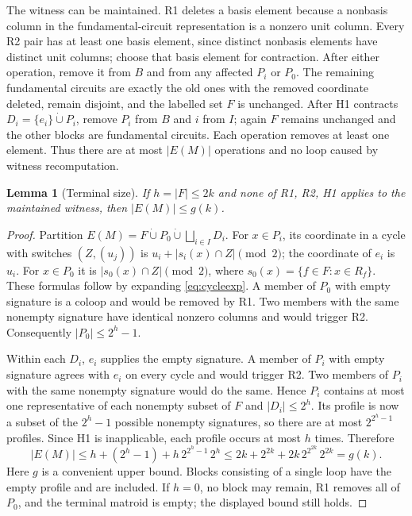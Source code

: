 \documentclass[11pt]{article}
\newtheorem{lemma}[theorem]{Lemma}
\begin{document}
The witness can be maintained.  R1 deletes a basis element because a
nonbasis column in the fundamental-circuit representation is a
nonzero unit column.  Every R2 pair has at least one basis element,
since distinct nonbasis elements have distinct unit columns; choose
that basis element for contraction.  After either operation, remove it
from $B$ and from any affected $P_i$ or $P_0$.  The remaining
fundamental circuits are exactly the old ones with the removed
coordinate deleted, remain disjoint, and the labelled set $F$ is
unchanged.  After H1 contracts $D_i=\{e_i\}\mathbin{\dot\cup}P_i$, remove
$P_i$ from $B$ and $i$ from $I$; again $F$ remains unchanged and the
other blocks are fundamental circuits.  Each operation removes at
least one element.  Thus there are at most $|E(M)|$ operations and no
loop caused by witness recomputation.

\begin{lemma}[Terminal size]\label{lem:size}
If $h=|F|\leq2k$ and none of R1, R2, H1 applies to the maintained
witness, then $|E(M)|\leq g(k)$.
\end{lemma}
\begin{proof}
Partition $E(M)=F\mathbin{\dot\cup}P_0\mathbin{\dot\cup}
\bigsqcup_{i\in I}D_i$.
For $x\in P_i$, its coordinate in a cycle with switches
$(Z,(u_j))$ is $u_i+|s_i(x)\cap Z|\pmod2$; the coordinate of $e_i$
is $u_i$.  For $x\in P_0$ it is $|s_0(x)\cap Z|\pmod2$, where
$s_0(x)=\{f\in F:x\in R_f\}$.  These formulas follow by expanding
\eqref{eq:cycleexp}.  A member of $P_0$ with empty signature is a
coloop and would be removed by R1.  Two members with the same
nonempty signature have identical nonzero columns and would trigger
R2.  Consequently $|P_0|\leq2^h-1$.

Within each $D_i$, $e_i$ supplies the empty signature.  A member of
$P_i$ with empty signature agrees with $e_i$ on every cycle and
would trigger R2.  Two members of $P_i$ with the same nonempty
signature would do the same.  Hence $P_i$ contains at most one
representative of each nonempty subset of $F$ and $|D_i|\leq2^h$.
Its profile is now a subset of the $2^h-1$ possible nonempty
signatures, so there are at most $2^{2^h-1}$ profiles.  Since H1 is
inapplicable, each profile occurs at most $h$ times.  Therefore
\[
 |E(M)|\leq h+(2^h-1)+h\,2^{2^h-1}\,2^h
          \leq2k+2^{2k}+2k\,2^{2^{2k}}\,2^{2k}=g(k).
\]
Here $g$ is a convenient upper bound.  Blocks consisting of a single
loop have the empty profile and are included.  If
$h=0$, no block may remain, R1 removes all of $P_0$, and the terminal
matroid is empty; the displayed bound still holds.
\end{proof}
\end{document}
